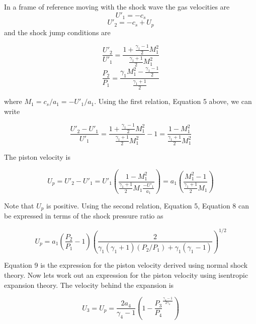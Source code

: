 In a frame of reference moving with the shock wave the gas velocities are
\begin{equation}
U'_1 = -c_s
\end{equation}
\begin{equation}
U'_2 = -c_s + U_p
\end{equation}
and the shock jump conditions are

\begin{equation}
\frac{U'_2}{U'_1} = \frac{1+\frac{\gamma_1-1}{2}M_1^2}{\frac{\gamma_1+1}{2}M_1^2} 
\end{equation}
\begin{equation}
\frac{P_2}{P_1} = \frac{\gamma_1M_1^2-\frac{\gamma_1-1}{2}}{\frac{\gamma_1+1}{2}} 
\end{equation}
\begin{center}
	where $M_1 = c_s/a_1 = -U'_1/a_1$. Using the first relation, Equation 5 above, we can write
\end{center}

\begin{equation}
\frac{U'_2 - U'_1}{U'_1} = \frac{1 + \frac{\gamma_1-1}{2}M_1^2}{\frac{\gamma_1+1}{2}M_1^2} - 1 = \frac{1 - M_1^2}{\frac{\gamma_1+1}{2}M_1^2}
\end{equation}

The piston velocity is

\begin{equation}
U_p = U'_2 - U'_1 = U'_1\left(\frac{1 - M_1^2}{\frac{\gamma_1+1}{2}M_1\frac{-U'_1}{a_1}}\right) = a_1\left(\frac{M_1^2 - 1}{\frac{\gamma_1+1}{2}M_1}\right) 
\end{equation}

Note that $U_p$ is positive. Using the second relation, Equation 5, Equation 8 can be expressed in terms of the shock pressure ratio as 

\begin{equation}
U_p = a_1\left(\frac{P_2}{P_1} - 1\right)\left(\frac{2}{\gamma_1(\gamma_1 + 1)(P_2/P_1) + \gamma_1(\gamma_1 - 1)}\right)^{1/2}
\end{equation}

Equation 9 is the expression for the piston velocity derived using normal shock theory. Now lets work out an expression for the piston velocity using isentropic expansion theory. The velocity behind the expansion is

\begin{equation}
U_3 = U_p = \frac{2a_4}{\gamma_4 - 1}\left(1 - \frac{P_3}{P_4}^{\frac{\gamma_4 - 1}{2\gamma_4}}\right)
\end{equation}

